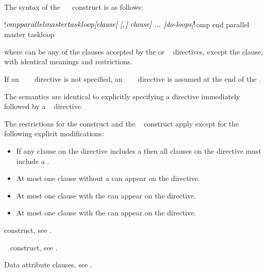 \begin{fortranspecific}
The syntax of the ~~ construct is as 
follows:

\begin{ompfPragma}
!$omp parallel master taskloop \plc{[clause[ [},\plc{] clause] ... ]}
    \plc{do-loops}
\plc{[}!$omp end parallel master taskloop\plc{]}
\end{ompfPragma}

where  can be any of the clauses accepted by the  or
~ directives, except the  clause,
with identical meanings and restrictions.

If an ~~~ directive is not 
specified, an ~~~ directive 
is assumed at the end of the .
\end{fortranspecific}

\descr
The semantics are identical to explicitly specifying a  directive
immediately followed by a ~ directive.

\restrictions
The restrictions for the  construct and the
~ construct apply except for the following
explicit modifications:

\begin{itemize}
\item If any  clause on the directive includes a
       then all  clauses
      on the directive must include a .
\item At most one  clause without a
       can appear on the directive.
\item At most one  clause with the 
       can appear on the directive.
\item At most one  clause with the 
       can appear on the directive.
\end{itemize}

\begin{crossrefs}
\item {} construct, see
.
\item {}~ construct, see
.
\item Data attribute clauses, see
.
\end{crossrefs}



